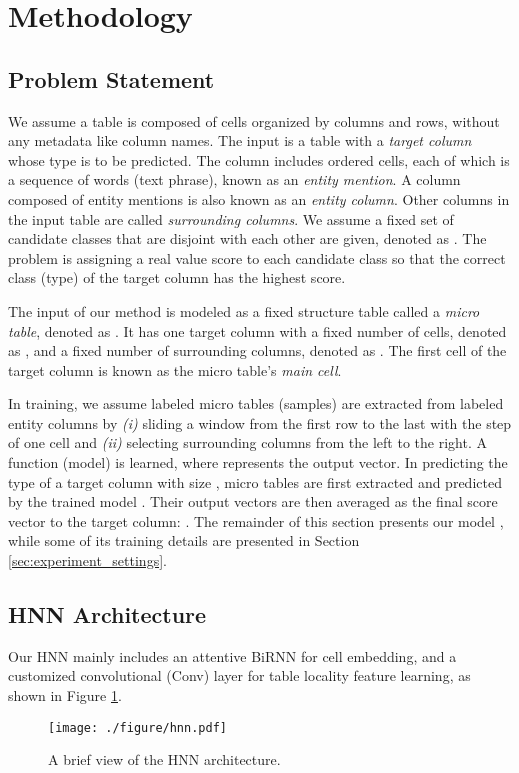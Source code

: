 \documentclass{article}
\begin{document}
\section{Methodology}

\subsection{Problem Statement}\label{sec:problem_statement}

We assume a table is composed of cells organized by columns and rows, 
without any metadata like column names.
The input is a table with a \textit{target column} whose type is to be predicted.
The column includes ordered cells, 
each of which is a sequence of words (text phrase), known as an \textit{entity mention}.
A column composed of entity mentions is also known as an \textit{entity column}.
Other columns in the input table are called \textit{surrounding columns}.
We assume a fixed set of candidate classes that are disjoint with each other are given, denoted as .
The problem is assigning a real value score to each candidate class so that the correct class (type) of the target column has the highest score.


The input of our method is modeled as a fixed structure table called a \textit{micro table}, denoted as .
It has one target column with a fixed number of cells, denoted as ,
and a fixed number of surrounding columns, denoted as .
The first cell of the target column  is known as the micro table's \textit{main cell}.

In training,
we assume  labeled micro tables (samples) are 
extracted from labeled entity columns by \textit{(i)} sliding a window from the first row to the last with the step of one cell and \textit{(ii)} selecting surrounding columns from the left to the right.
A function (model)  is learned, 
where  represents the output vector. 
In predicting the type of a target column with size , 
micro tables are first extracted 
and predicted by the trained model . 
Their output vectors are then averaged as the final score vector to the target column: 
.
The remainder of this section presents our model , 
while some of its training details are presented in Section \ref{sec:experiment_settings}.

\subsection{HNN Architecture}
Our HNN mainly includes an attentive BiRNN for cell embedding,
and a customized convolutional (Conv) layer for table locality feature learning, 
as shown in Figure \ref{fig:hnn}.
\vspace{-0.2cm}
\begin{figure}[h]
\centering
\texttt{[image: ./figure/hnn.pdf]}
\vspace{-0.35cm}
\caption{A brief view of the HNN architecture.
}
\label{fig:hnn}
\end{figure}
\vspace{-0.2cm}
\end{document}
